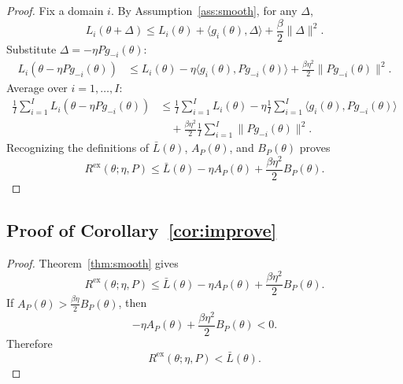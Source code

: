 \documentclass{article}
\begin{document}
\begin{proof}
Fix a domain $i$. By Assumption~\ref{ass:smooth}, for any $\Delta$,
\begin{equation}
    L_i(\theta+\Delta)
    \le
    L_i(\theta) + \langle g_i(\theta), \Delta\rangle + \frac{\beta}{2}\|\Delta\|^2.
\end{equation}
Substitute $\Delta = -\eta P g_{-i}(\theta)$:
\begin{align}
    L_i(\theta - \eta P g_{-i}(\theta))
    &\le
    L_i(\theta)
    -
    \eta \langle g_i(\theta), P g_{-i}(\theta)\rangle
    +
    \frac{\beta \eta^2}{2}\|P g_{-i}(\theta)\|^2.
\end{align}
Average over $i=1,\dots,I$:
\begin{align}
    \frac{1}{I}\sum_{i=1}^{I}L_i(\theta - \eta P g_{-i}(\theta))
    &\le
    \frac{1}{I}\sum_{i=1}^{I}L_i(\theta)
    -
    \eta\frac{1}{I}\sum_{i=1}^{I}\langle g_i(\theta), P g_{-i}(\theta)\rangle \nonumber\\
    &\quad
    +
    \frac{\beta \eta^2}{2}\frac{1}{I}\sum_{i=1}^{I}\|P g_{-i}(\theta)\|^2.
\end{align}
Recognizing the definitions of $\bar L(\theta)$, $A_P(\theta)$, and $B_P(\theta)$ proves
\begin{equation}
    R^{\mathrm{ex}}(\theta;\eta,P)
    \le
    \bar L(\theta) - \eta A_P(\theta) + \frac{\beta \eta^2}{2}B_P(\theta).
\end{equation}
\end{proof}

\subsection{Proof of Corollary~\ref{cor:improve}}

\begin{proof}
Theorem~\ref{thm:smooth} gives
\begin{equation}
    R^{\mathrm{ex}}(\theta;\eta,P)
    \le
    \bar L(\theta) - \eta A_P(\theta) + \frac{\beta\eta^2}{2}B_P(\theta).
\end{equation}
If $A_P(\theta) > \frac{\beta\eta}{2}B_P(\theta)$, then
\begin{equation}
    -\eta A_P(\theta) + \frac{\beta\eta^2}{2}B_P(\theta) < 0.
\end{equation}
Therefore
\begin{equation}
    R^{\mathrm{ex}}(\theta;\eta,P) < \bar L(\theta).
\end{equation}
\end{proof}
\end{document}
